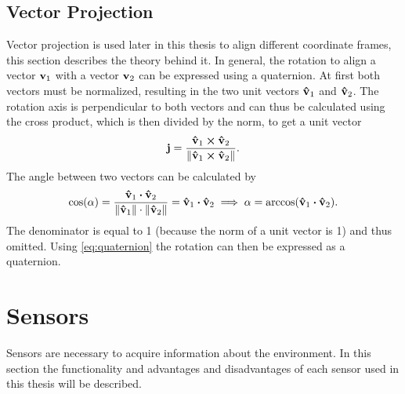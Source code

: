 \subsection{Vector Projection}
\label{subsec:vector_projection}
Vector projection is used later in this thesis to align different coordinate frames, this section describes the theory behind it.
In general, the rotation to align a vector $\vb{v}_1$ with a vector $\vb{v}_2$ can be expressed using a quaternion.
At first both vectors must be normalized, resulting in the two unit vectors $\vu{v}_1$ and $\vu{v}_2$.
The rotation axis is perpendicular to both vectors and can thus be calculated using the cross product, which is then divided by the norm, to get a unit vector
\begin{equation}
    \vb{j} = \frac{\vu{v}_1 \cp \vu{v}_2}{\norm{\vu{v}_1 \cp \vu{v}_2}}.
\end{equation}
The angle between two vectors can be calculated by
\begin{equation}
    \cos(\alpha) = \frac{\vu{v}_1 \vdot \vu{v}_2}{\norm{\vu{v}_1} \cdot \norm{\vu{v}_2}}
    = \vu{v}_1 \vdot \vu{v}_2 \implies
    \alpha = \arccos(\vu{v}_1 \vdot \vu{v}_2).
\end{equation}
The denominator is equal to 1 (because the norm of a unit vector is 1) and thus omitted.
Using \cref{eq:quaternion} the rotation can then be expressed as a quaternion.



\section{Sensors}
\label{sec:sensors}
Sensors are necessary to acquire information about the environment.
In this section the functionality and advantages and disadvantages of each sensor used in this thesis will be described.


